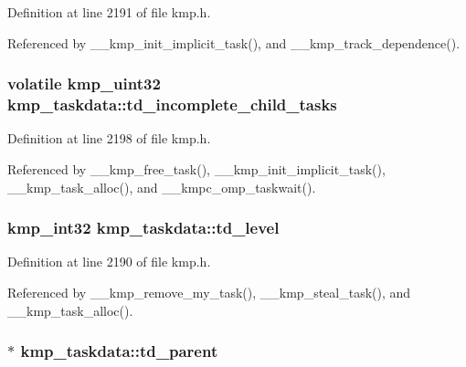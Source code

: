 Definition at line 2191 of file kmp.\-h.



Referenced by \-\_\-\-\_\-kmp\-\_\-init\-\_\-implicit\-\_\-task(), and \-\_\-\-\_\-kmp\-\_\-track\-\_\-dependence().

\hypertarget{structkmp__taskdata_af2d9a1116312e78182a768bb19bc5021}{
\subsubsection[{td\-\_\-incomplete\-\_\-child\-\_\-tasks}]{\setlength{\rightskip}{0pt plus 5cm}volatile kmp\-\_\-uint32 kmp\-\_\-taskdata\-::td\-\_\-incomplete\-\_\-child\-\_\-tasks}}\label{structkmp__taskdata_af2d9a1116312e78182a768bb19bc5021}


Definition at line 2198 of file kmp.\-h.



Referenced by \-\_\-\-\_\-kmp\-\_\-free\-\_\-task(), \-\_\-\-\_\-kmp\-\_\-init\-\_\-implicit\-\_\-task(), \-\_\-\-\_\-kmp\-\_\-task\-\_\-alloc(), and \-\_\-\-\_\-kmpc\-\_\-omp\-\_\-taskwait().

\hypertarget{structkmp__taskdata_a1dce0edb2ca087c66580ff685fae081a}{
\subsubsection[{td\-\_\-level}]{\setlength{\rightskip}{0pt plus 5cm}kmp\-\_\-int32 kmp\-\_\-taskdata\-::td\-\_\-level}}\label{structkmp__taskdata_a1dce0edb2ca087c66580ff685fae081a}


Definition at line 2190 of file kmp.\-h.



Referenced by \-\_\-\-\_\-kmp\-\_\-remove\-\_\-my\-\_\-task(), \-\_\-\-\_\-kmp\-\_\-steal\-\_\-task(), and \-\_\-\-\_\-kmp\-\_\-task\-\_\-alloc().

\hypertarget{structkmp__taskdata_a47e9134b90866241cb795112acf9dabb}{
\subsubsection[{td\-\_\-parent}]{$\ast$ kmp\-\_\-taskdata\-::td\-\_\-parent}}\label{structkmp__taskdata_a47e9134b90866241cb795112acf9dabb}


